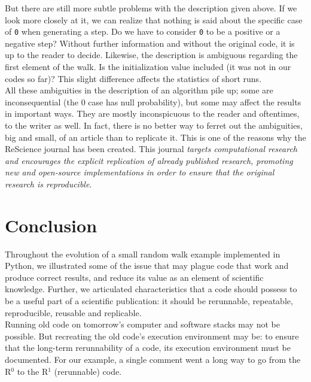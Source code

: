 \documentclass[a4paper,11pt]{article}
\begin{document}
But there are still more subtle problems with the description given above.
If we look more closely at it, we can realize
that nothing is said about the specific case of {\tt 0} when generating a step.
Do we have to consider {\tt 0} to be a positive or a negative step? Without
further information and without the original code, it is up to the reader to
decide. Likewise, the description is ambiguous regarding the first element of the walk. Is the initialization value included (it was not in our codes so far)? This slight difference affects the statistics of short runs.\\

All these ambiguities in the description of an algorithm pile up; some are inconsequential (the 0 case has null probability), but some may affect the results in important ways. They are mostly inconspicuous to the reader and oftentimes, to the writer as well. In fact,  there is no better way to ferret out the ambiguities, big and small, of an article than to replicate it. This is one of the reasons why the ReScience journal \citep{Rougier:2017} has been created. This journal {\em targets  computational research and encourages the explicit replication of already published research, promoting new and open-source implementations in order to ensure that the original research is reproducible}.\\

\section*{Conclusion}

Throughout the evolution of a small random walk example implemented in Python, we illustrated some of the issue that may plague code that work and produce correct results, and reduce its value as an element of scientific knowledge.
Further, we articulated characteristics that a code should possess to be a useful part of a scientific publication: it should be rerunnable, repeatable, reproducible, reusable and replicable.\\

Running old code on tomorrow’s computer and software stacks may not be possible. But recreating the old code’s execution environment may be: to ensure that the long-term rerunnability of a code, its execution environment must be documented. For our example, a single comment went a long way to go from the R$^0$ to the R$^1$ (rerunnable) code.\\
\end{document}
